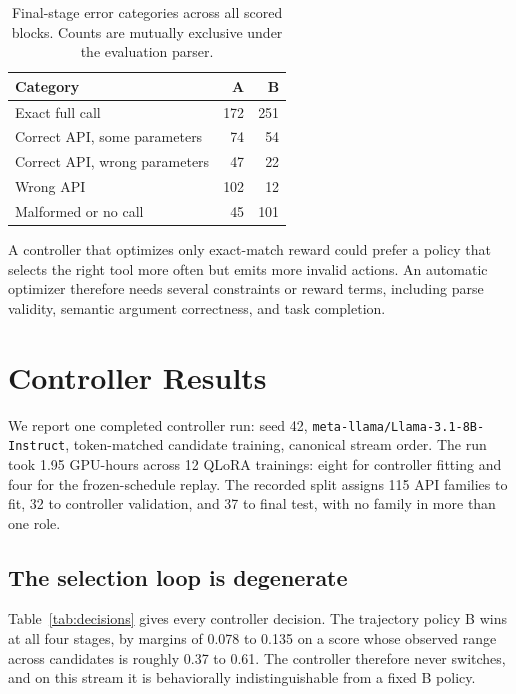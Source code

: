 \documentclass{article}
\begin{document}
\begin{table}[t]
\centering
\caption{Final-stage error categories across all scored blocks. Counts are mutually exclusive under the evaluation parser.}
\label{tab:errors}
\begin{tabular}{lrr}
\toprule
Category & A & B \\
\midrule
Exact full call & 172 & 251 \\
Correct API, some parameters & 74 & 54 \\
Correct API, wrong parameters & 47 & 22 \\
Wrong API & 102 & 12 \\
Malformed or no call & 45 & 101 \\
\bottomrule
\end{tabular}
\end{table}

A controller that optimizes only exact-match reward could prefer a policy that selects the right tool more often but emits more invalid actions. An automatic optimizer therefore needs several constraints or reward terms, including parse validity, semantic argument correctness, and task completion.

\section{Controller Results}

We report one completed controller run: seed 42, \texttt{meta-llama/Llama-3.1-8B-Instruct}, token-matched candidate training, canonical stream order. The run took 1.95 GPU-hours across 12 QLoRA trainings: eight for controller fitting and four for the frozen-schedule replay. The recorded split assigns 115 API families to fit, 32 to controller validation, and 37 to final test, with no family in more than one role.

\subsection{The selection loop is degenerate}

Table~\ref{tab:decisions} gives every controller decision. The trajectory policy B wins at all four stages, by margins of 0.078 to 0.135 on a score whose observed range across candidates is roughly 0.37 to 0.61. The controller therefore never switches, and on this stream it is behaviorally indistinguishable from a fixed B policy.
\end{document}
